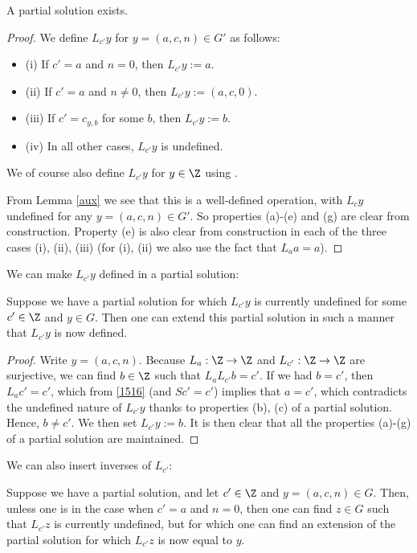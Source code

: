 \begin{lemma}\label{part-exist}  A partial solution exists.
\end{lemma}

\begin{proof}  We define $L_{c'} y$ for $y = (a,c,n) \in G'$ as follows:
\begin{itemize}
  \item (i) If $c' = a$ and $n=0$, then $L_{c'} y := a$.
  \item (ii) If $c' = a$ and $n \neq 0$, then $L_{c'} y := (a,c,0)$.
  \item (iii) If $c' = c_{y,b}$ for some $b$, then $L_{c'} y := b$.
  \item (iv) In all other cases, $L_{c'} y$ is undefined.
\end{itemize}
We of course also define $L_{c'} y$ for $y \in \Z$ using .

From Lemma \ref{aux} we see that this is a well-defined operation, with $L_c y$ undefined for any $y = (a,c,n) \in G'$.  So properties (a)-(e) and (g) are clear from construction.  Property (e) is also clear from construction in each of the three cases (i), (ii), (iii) (for (i), (ii) we also use the fact that $L_a a = a$).
\end{proof}

We can make $L_{c'} y$ defined in a partial solution:

\begin{lemma}\label{first-ext}  Suppose we have a partial solution for which $L_{c'} y$ is currently undefined for some $c' \in \Z$ and $y \in G$.  Then one can extend this partial solution in such a manner that $L_{c'} y$ is now defined.
\end{lemma}

\begin{proof} Write $y = (a,c,n)$. Because $L_a: \Z \to \Z$ and $L_{c'}: \Z \to \Z$ are surjective, we can find $b \in \Z$ such that $L_a L_{c'} b = c'$.  If we had $b=c'$, then $L_a c' = c'$, which from \eqref{1516} (and $Sc' = c'$) implies that $a = c'$, which contradicts the undefined nature of $L_{c'} y$ thanks to properties (b), (c) of a partial solution.  Hence, $b \neq c'$.
  We then set $L_{c'} y := b$.  It is then clear that all the properties (a)-(g) of a partial solution are maintained.
\end{proof}

We can also insert inverses of $L_{c'}$:

\begin{lemma}\label{second-ext}  Suppose we have a partial solution, and let $c' \in \Z$ and $y = (a,c,n) \in G$.  Then, unless one is in the case when $c'=a$ and $n=0$, then one can find $z \in G$ such that $L_{c'} z$ is currently undefined, but for which one can find an extension of the partial solution for which $L_{c'} z$ is now equal to $y$.
\end{lemma}


